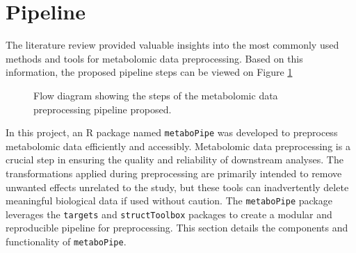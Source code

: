 \documentclass[ENG, BIB]{TFUOC}%
\begin{document}
\section{Pipeline}
The literature review provided valuable insights into the most commonly used methods and tools for metabolomic data preprocessing. Based on this information, the proposed pipeline steps can be viewed on Figure \ref{fig:pipeline}
\begin{figure}[ht]
    \centering
    \caption{Flow diagram showing the steps of the metabolomic data preprocessing pipeline proposed.}
    \label{fig:pipeline}
\end{figure}

In this project, an R package named \texttt{metaboPipe} was developed to preprocess metabolomic data efficiently and accessibly. Metabolomic data preprocessing is a crucial step in ensuring the quality and reliability of downstream analyses. The transformations applied during preprocessing are primarily intended to remove unwanted effects unrelated to the study, but these tools can inadvertently delete meaningful biological data if used without caution. The \texttt{metaboPipe} package leverages the \texttt{targets} and \texttt{structToolbox} packages to create a modular and reproducible pipeline for preprocessing. This section details the components and functionality of \texttt{metaboPipe}.
\end{document}
